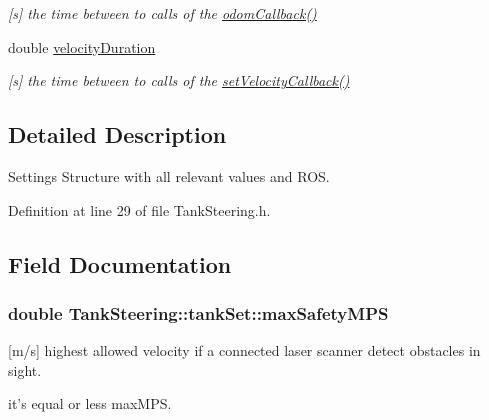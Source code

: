 \begin{DoxyCompactItemize}
\begin{DoxyCompactList}\small\item\em \mbox{[}s\mbox{]} the time between to calls of the \hyperlink{classTankSteering_ae19dbe86e3ae541c06525af2721a37dd}{odom\-Callback()} \end{DoxyCompactList}\item 
\hypertarget{structTankSteering_1_1tankSet_a30ffc7283de96cfdf97cd987de2cad63}{double \hyperlink{structTankSteering_1_1tankSet_a30ffc7283de96cfdf97cd987de2cad63}{velocity\-Duration}}\label{structTankSteering_1_1tankSet_a30ffc7283de96cfdf97cd987de2cad63}

\begin{DoxyCompactList}\small\item\em \mbox{[}s\mbox{]} the time between to calls of the \hyperlink{classTankSteering_ab1335cf95b773d0b8908d74ebb61c289}{set\-Velocity\-Callback()} \end{DoxyCompactList}\end{DoxyCompactItemize}


\subsection{Detailed Description}
Settings Structure with all relevant values and R\-O\-S. 

Definition at line 29 of file Tank\-Steering.\-h.



\subsection{Field Documentation}
\hypertarget{structTankSteering_1_1tankSet_ab604472ee21a35336e7be92ed0a9616f}{
\subsubsection[{max\-Safety\-M\-P\-S}]{\setlength{\rightskip}{0pt plus 5cm}double Tank\-Steering\-::tank\-Set\-::max\-Safety\-M\-P\-S}}\label{structTankSteering_1_1tankSet_ab604472ee21a35336e7be92ed0a9616f}


\mbox{[}m/s\mbox{]} highest allowed velocity if a connected laser scanner detect obstacles in sight. 

it's equal or less max\-M\-P\-S. 

